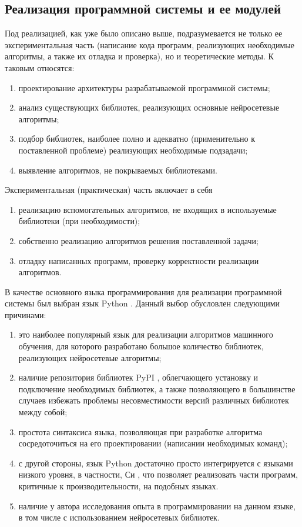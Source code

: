 \subsection{Реализация программной системы и ее модулей}
Под реализацией, как уже было описано выше, подразумевается не только ее экспериментальная часть (написание кода программ, реализующих необходимые
алгоритмы, а также их отладка и проверка), но и теоретические методы. К таковым относятся:
\begin{enumerate}[1)]
    \item проектирование архитектуры разрабатываемой программной системы;
    \item анализ существующих библиотек, реализующих основные нейросетевые алгоритмы;
    \item подбор библиотек, наиболее полно и адекватно (применительно к поставленной проблеме) реализующих необходимые подзадачи;
    \item выявление алгоритмов, не покрываемых библиотеками.
\end{enumerate}
Экспериментальная (практическая) часть включает в себя
\begin{enumerate}[1)]
    \item реализацию вспомогательных алгоритмов, не входящих в используемые библиотеки (при необходимости);
    \item собственно реализацию алгоритмов решения поставленной задачи;
    \item отладку написанных программ, проверку корректности реализации алгоритмов.
\end{enumerate}

В качестве основного языка программирования для реализации программной системы был выбран язык Python \cite{CS-R9526, 10.5555/1593511, python}.
Данный выбор обусловлен следующими причинами:
\begin{enumerate}[1)]
    \item это наиболее популярный \cite{ml-popularity-2017} язык для реализации алгоритмов машинного обучения, для которого разработано большое 
          количество библиотек, реализующих нейросетевые алгоритмы;
    \item наличие репозитория библиотек PyPI \cite{pypi}, облегчающего установку и подключение необходимых библиотек, а также позволяющего в большинстве
          случаев избежать проблемы несовместимости версий различных библиотек между собой;
    \item простота синтаксиса языка, позволяющая при разработке алгоритма сосредоточиться на его проектировании (написании необходимых команд);
    \item с другой стороны, язык Python достаточно просто интегрируется с языками низкого уровня, в частности, Си \cite{python-c-api}, что позволяет
          реализовать части программ, критичные к производительности, на подобных языках.
    \item наличие у автора исследования опыта в программировании на данном языке, в том числе с использованием нейросетевых библиотек.
\end{enumerate}

